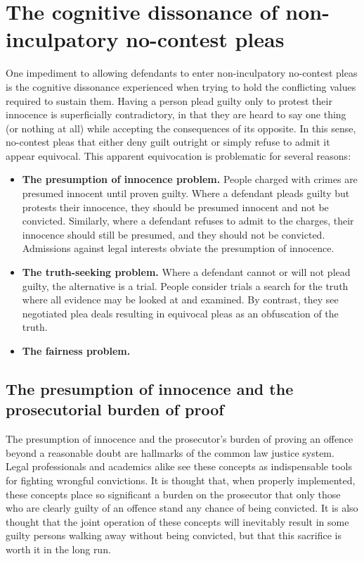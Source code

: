 \section{The cognitive dissonance of non-inculpatory no-contest pleas}

One impediment to allowing defendants to enter non-inculpatory no-contest pleas is the cognitive dissonance experienced when trying to hold the conflicting values required to sustain them. Having a person plead guilty only to protest their innocence is superficially contradictory, in that they are heard to say one thing (or nothing at all) while accepting the consequences of its opposite. In this sense, no-contest pleas that either deny guilt outright or simply refuse to admit it appear equivocal. This apparent equivocation is problematic for several reasons:

\begin{itemize}
    \item \textbf{The presumption of innocence problem.} People charged with crimes are presumed innocent until proven guilty. Where a defendant pleads guilty but protests their innocence, they should be presumed innocent and not be convicted. Similarly, where a defendant refuses to admit to the charges, their innocence should still be presumed, and they should not be convicted. Admissions against legal interests obviate the presumption of innocence.
    \item \textbf{The truth-seeking problem.} Where a defendant cannot or will not plead guilty, the alternative is a trial. People consider trials a search for the truth where all evidence may be looked at and examined. By contrast, they see negotiated plea deals resulting in equivocal pleas as an obfuscation of the truth. 
    \item \textbf{The fairness problem.} 
\end{itemize}

\subsection{The presumption of innocence and the prosecutorial burden of proof}

The presumption of innocence and the prosecutor's burden of proving an offence beyond a reasonable doubt are hallmarks of the common law justice system. Legal professionals and academics alike see these concepts as indispensable tools for fighting wrongful convictions. It is thought that, when properly implemented, these concepts place so significant a burden on the prosecutor that only those who are clearly guilty of an offence stand any chance of being convicted. It is also thought that the joint operation of these concepts will inevitably result in some guilty persons walking away without being convicted, but that this sacrifice is worth it in the long run.



